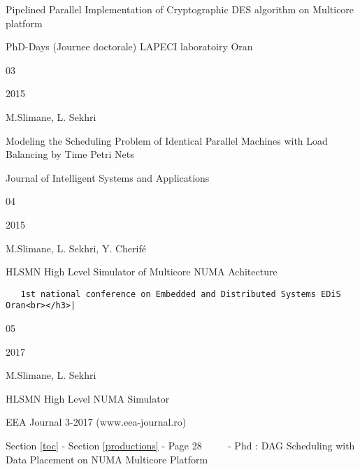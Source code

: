 \documentclass[11pt]{article}
\begin{document}
\textbar{}

Pipelined Parallel Implementation of Cryptographic DES algorithm on
Multicore platform

\textbar{}

PhD-Days (Journee doctorale) LAPECI laboratoiry Oran

\textbar{} \textbar{}

03

\textbar{}

2015

\textbar{}

M.Slimane, L. Sekhri

\textbar{}

Modeling the Scheduling Problem of Identical Parallel Machines with Load
Balancing by Time Petri Nets

\textbar{}

Journal of Intelligent Systems and Applications

\textbar{} \textbar{}

04

\textbar{}

2015

\textbar{}

M.Slimane, L. Sekhri, Y. Cherifé

\textbar{}

HLSMN High Level Simulator of Multicore NUMA Achitecture

\textbar{}

\begin{verbatim}
   1st national conference on Embedded and Distributed Systems EDiS Oran<br></h3>|
\end{verbatim}

\textbar{}

05

\textbar{}

2017

\textbar{}

M.Slimane, L. Sekhri

\textbar{}

HLSMN High Level NUMA Simulator

\textbar{}

EEA Journal 3-2017 (www.eea-journal.ro)

     {Section \ref{toc} - Section \ref{productions} - Page 28 ~~~~ - Phd :
DAG Scheduling with Data Placement on NUMA Multicore Platform}

 


    
    
    
    
\end{document}
